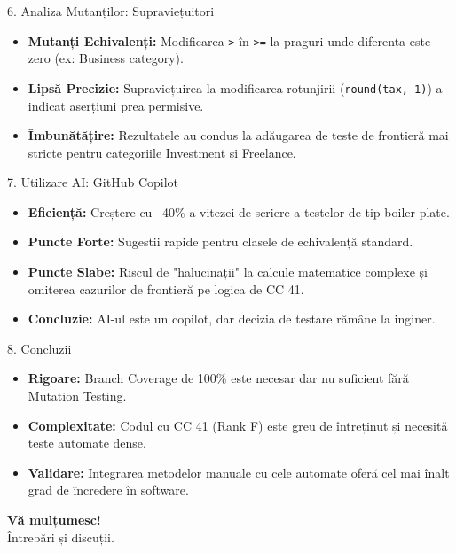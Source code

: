 \documentclass{beamer}
\begin{document}
\begin{frame}{6. Analiza Mutanților: Supraviețuitori}
    \begin{itemize}
        \item \textbf{Mutanți Echivalenți:} Modificarea \texttt{>} în \texttt{>=} la praguri unde diferența este zero (ex: Business category).
        \item \textbf{Lipsă Precizie:} Supraviețuirea la modificarea rotunjirii (\texttt{round(tax, 1)}) a indicat aserțiuni prea permisive.
        \item \textbf{Îmbunătățire:} Rezultatele au condus la adăugarea de teste de frontieră mai stricte pentru categoriile Investment și Freelance.
    \end{itemize}
\end{frame}

\begin{frame}{7. Utilizare AI: GitHub Copilot}
    \begin{itemize}
        \item \textbf{Eficiență:} Creștere cu ~40\% a vitezei de scriere a testelor de tip boiler-plate.
        \item \textbf{Puncte Forte:} Sugestii rapide pentru clasele de echivalență standard.
        \item \textbf{Puncte Slabe:} Riscul de "halucinații" la calcule matematice complexe și omiterea cazurilor de frontieră pe logica de CC 41.
        \item \textbf{Concluzie:} AI-ul este un copilot, dar decizia de testare rămâne la inginer.
    \end{itemize}
\end{frame}

\begin{frame}{8. Concluzii}
    \begin{itemize}
        \item \textbf{Rigoare:} Branch Coverage de 100\% este necesar dar nu suficient fără Mutation Testing.
        \item \textbf{Complexitate:} Codul cu CC 41 (Rank F) este greu de întreținut și necesită teste automate dense.
        \item \textbf{Validare:} Integrarea metodelor manuale cu cele automate oferă cel mai înalt grad de încredere în software.
    \end{itemize}
\end{frame}

\begin{frame}
    \centering
    \Huge \textbf{Vă mulțumesc!} \\
    \bigskip
    \Large Întrebări și discuții.
\end{frame}
\end{document}
